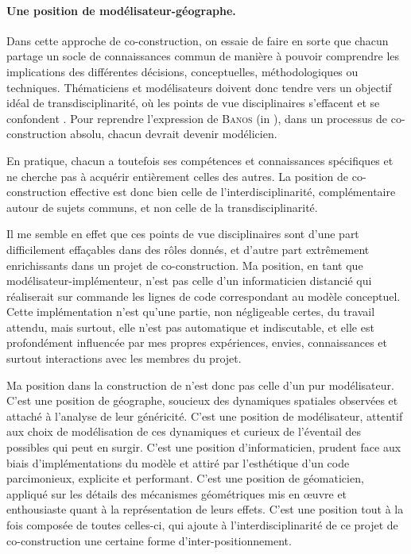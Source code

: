 \paragraph{Une position de \og modélisateur-géographe\fg{}.}

Dans cette approche de co-construction, on essaie de faire en sorte que chacun partage un socle de connaissances commun de manière à pouvoir comprendre les implications des différentes décisions, conceptuelles, méthodologiques ou techniques.
Thématiciens et modélisateurs doivent donc tendre vers un objectif idéal de transdisciplinarité, où les points de vue disciplinaires s'effacent et se confondent \autocite[14]{gravier_deux_2018}.
Pour reprendre l'expression de \textsc{Banos} (in \textcite[]{ouriachi_lelaboration_2017}), dans un processus de co-construction absolu, chacun devrait devenir \og modélicien\fg{}.

En pratique, chacun a toutefois ses compétences et connaissances spécifiques et ne cherche pas à acquérir entièrement celles des autres.
La position de co-construction effective est donc bien celle de l'interdisciplinarité, complémentaire autour de sujets communs, et non celle de la transdisciplinarité.

Il me semble en effet que ces points de vue disciplinaires sont d'une part difficilement \og effaçables\fg{} dans des rôles donnés, et d'autre part extrêmement enrichissants dans un projet de co-construction.
Ma position, en tant que modélisateur-\og{}implémenteur\fg{}, n'est pas celle d'un informaticien distancié qui réaliserait sur commande les lignes de code correspondant au modèle conceptuel.
Cette implémentation n'est qu'une partie, non négligeable certes, du travail attendu, mais surtout, elle n'est pas automatique et indiscutable, et elle est profondément influencée par mes propres expériences, envies, connaissances et surtout interactions avec les membres du projet.

Ma position dans la construction de \simfeodal{} n'est donc pas celle d'un pur modélisateur.
C'est une position de géographe, soucieux des dynamiques spatiales observées et attaché à l'analyse de leur généricité.
C'est une position de modélisateur, attentif aux choix de modélisation de ces dynamiques et curieux de l'éventail des possibles qui peut en surgir.
C'est une position d'informaticien, prudent face aux biais d'implémentations du modèle et attiré par l'esthétique d'un code parcimonieux, explicite et performant.
C'est une position de géomaticien, appliqué sur les détails des mécanismes géométriques mis en œuvre et enthousiaste quant à la représentation de leurs effets.
C'est une position tout à la fois composée de toutes celles-ci, qui ajoute à l'interdisciplinarité de ce projet de co-construction une certaine forme d'inter-positionnement.



